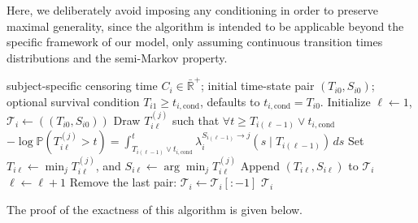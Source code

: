 \documentclass{sn-jnl}
\begin{document}
Here, we deliberately avoid imposing any conditioning in order to preserve maximal generality, since the algorithm is intended to be applicable beyond the specific framework of our model, only assuming continuous transition times distributions and the semi-Markov property.

\begin{algorithm}[H]
    \caption{Simulation of trajectory $i$}
    \label{alg:trajectory-sim}

    \begin{algorithmic}[1]
        \renewcommand{\algorithmicrequire}{\textbf{Input:}}
        \Require subject-specific censoring time $C_i \in \bar{\mathbb{R}}^+$; initial time-state pair $(T_{i0}, S_{i0})$; optional survival condition $T_{i1} \geq t_{i, \mathrm{cond}}$, defaults to $t_{i, \mathrm{cond}} = T_{i0}$.
        \Statex
        \State Initialize $\ell \gets 1$, $\mathcal{T}_i \gets \left( (T_{i0}, S_{i0}) \right)$
        \Statex
        \State Draw $T_{i\ell}^{(j)}$ such that $\forall t \geq T_{i(\ell-1)} \vee t_{i, \mathrm{cond}}$
        \Statex \hspace{\algorithmicindent} \hspace{\algorithmicindent} $-\log \mathbb{P}(T_{i\ell}^{(j)} > t) = \int_{T_{i(\ell-1)} \vee t_{i, \mathrm{cond}}}^t \lambda_i^{S_{i(\ell-1)} \to j}(s \mid T_{i(\ell-1)})\, ds$
        \EndFor
        \Statex
        \State Set $T_{i\ell} \gets \min_j T_{i\ell}^{(j)}$, and $S_{i\ell} \gets \arg \min_j T_{i\ell}^{(j)}$
        \State Append $(T_{i\ell}, S_{i\ell})$ to $\mathcal{T}_i$
        \State $\ell \gets \ell + 1$
        \EndWhile
        \Statex
        \State Remove the last pair: $\mathcal{T}_i \gets \mathcal{T}_i[:-1]$
        \EndIf
        \State \Return $\mathcal{T}_i$
    \end{algorithmic}
\end{algorithm}

The proof of the exactness of this algorithm is given below.
\end{document}
